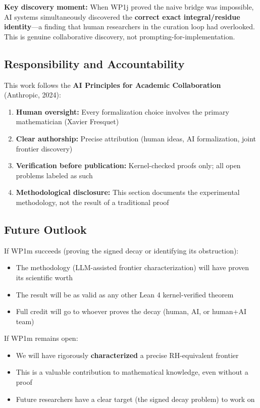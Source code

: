 \documentclass[11pt,a4paper]{article}
\theoremstyle{plain}
\theoremstyle{definition}
\theoremstyle{remark}
\begin{document}
\textbf{Key discovery moment:} When WP1j proved the naive bridge was impossible, AI systems simultaneously discovered the \textbf{correct exact integral/residue identity}---a finding that human researchers in the curation loop had overlooked. This is genuine collaborative discovery, not prompting-for-implementation.

\subsection*{Responsibility and Accountability}

This work follows the \textbf{AI Principles for Academic Collaboration} (Anthropic, 2024):

\begin{enumerate}[label=\arabic*)]
  \item \textbf{Human oversight:} Every formalization choice involves the primary mathematician (Xavier Fresquet)
  \item \textbf{Clear authorship:} Precise attribution (human ideas, AI formalization, joint frontier discovery)
  \item \textbf{Verification before publication:} Kernel-checked proofs only; all open problems labeled as such
  \item \textbf{Methodological disclosure:} This section documents the experimental methodology, not the result of a traditional proof
\end{enumerate}

\subsection*{Future Outlook}

If WP1m succeeds (proving the signed decay or identifying its obstruction):
\begin{itemize}[leftmargin=2em]
  \item \checkmark{} The methodology (LLM-assisted frontier characterization) will have proven its scientific worth
  \item \checkmark{} The result will be as valid as any other Lean 4 kernel-verified theorem
  \item \checkmark{} Full credit will go to whoever proves the decay (human, AI, or human+AI team)
\end{itemize}

If WP1m remains open:
\begin{itemize}[leftmargin=2em]
  \item \checkmark{} We will have rigorously \textbf{characterized} a precise RH-equivalent frontier
  \item \checkmark{} This is a valuable contribution to mathematical knowledge, even without a proof
  \item \checkmark{} Future researchers have a clear target (the signed decay problem) to work on
\end{itemize}
\end{document}
